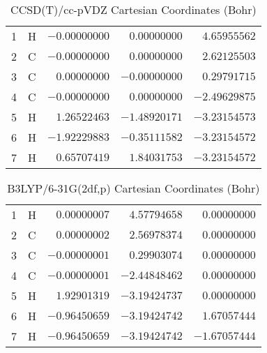 \documentclass[10pt,oneside]{article}
\begin{document}
\begin{table}[h!]
\centering
\caption{CCSD(T)/cc-pVDZ Cartesian Coordinates (Bohr)}
\begin{tabular}{llrrr}
1  & H  & $-0.00000000$ & $ 0.00000000$ & $ 4.65955562$ \\
2  & C  & $-0.00000000$ & $ 0.00000000$ & $ 2.62125503$ \\
3  & C  & $ 0.00000000$ & $-0.00000000$ & $ 0.29791715$ \\
4  & C  & $-0.00000000$ & $ 0.00000000$ & $-2.49629875$ \\
5  & H  & $ 1.26522463$ & $-1.48920171$ & $-3.23154573$ \\
6  & H  & $-1.92229883$ & $-0.35111582$ & $-3.23154572$ \\
7  & H  & $ 0.65707419$ & $ 1.84031753$ & $-3.23154572$ \\
\end{tabular}
\end{table}

\begin{table}[h!]
\centering
\caption{B3LYP/6-31G(2df,p) Cartesian Coordinates (Bohr)}
\begin{tabular}{llrrr}
1  & H  & $ 0.00000007$ & $ 4.57794658$ & $ 0.00000000$ \\
2  & C  & $ 0.00000002$ & $ 2.56978374$ & $ 0.00000000$ \\
3  & C  & $-0.00000001$ & $ 0.29903074$ & $ 0.00000000$ \\
4  & C  & $-0.00000001$ & $-2.44848462$ & $ 0.00000000$ \\
5  & H  & $ 1.92901319$ & $-3.19424737$ & $ 0.00000000$ \\
6  & H  & $-0.96450659$ & $-3.19424742$ & $ 1.67057444$ \\
7  & H  & $-0.96450659$ & $-3.19424742$ & $-1.67057444$ \\
\end{tabular}
\end{table}

\clearpage
\end{document}
